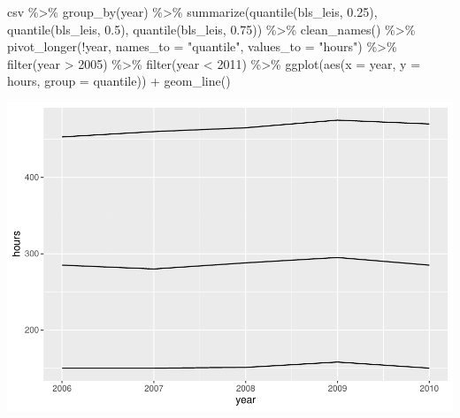 \documentclass[
]{article}
\newenvironment{Shaded}{\begin{snugshade}}{\end{snugshade}}
\newcommand{\AttributeTok}[1]{\textcolor[rgb]{0.77,0.63,0.00}{#1}}
\newcommand{\DecValTok}[1]{\textcolor[rgb]{0.00,0.00,0.81}{#1}}
\newcommand{\FloatTok}[1]{\textcolor[rgb]{0.00,0.00,0.81}{#1}}
\newcommand{\FunctionTok}[1]{\textcolor[rgb]{0.00,0.00,0.00}{#1}}
\newcommand{\NormalTok}[1]{#1}
\newcommand{\SpecialCharTok}[1]{\textcolor[rgb]{0.00,0.00,0.00}{#1}}
\newcommand{\StringTok}[1]{\textcolor[rgb]{0.31,0.60,0.02}{#1}}
\begin{document}
\begin{Shaded}
\begin{Highlighting}[]
\NormalTok{csv }\SpecialCharTok{\%\textgreater{}\%}
  \FunctionTok{group\_by}\NormalTok{(year) }\SpecialCharTok{\%\textgreater{}\%}
  \FunctionTok{summarize}\NormalTok{(}\FunctionTok{quantile}\NormalTok{(bls\_leis, }\FloatTok{0.25}\NormalTok{), }\FunctionTok{quantile}\NormalTok{(bls\_leis, }\FloatTok{0.5}\NormalTok{), }\FunctionTok{quantile}\NormalTok{(bls\_leis, }\FloatTok{0.75}\NormalTok{)) }\SpecialCharTok{\%\textgreater{}\%}
  \FunctionTok{clean\_names}\NormalTok{() }\SpecialCharTok{\%\textgreater{}\%}
  \FunctionTok{pivot\_longer}\NormalTok{(}\SpecialCharTok{!}\NormalTok{year, }\AttributeTok{names\_to =} \StringTok{"quantile"}\NormalTok{, }\AttributeTok{values\_to =} \StringTok{"hours"}\NormalTok{) }\SpecialCharTok{\%\textgreater{}\%}
  \FunctionTok{filter}\NormalTok{(year }\SpecialCharTok{\textgreater{}} \DecValTok{2005}\NormalTok{) }\SpecialCharTok{\%\textgreater{}\%}
  \FunctionTok{filter}\NormalTok{(year }\SpecialCharTok{\textless{}} \DecValTok{2011}\NormalTok{) }\SpecialCharTok{\%\textgreater{}\%}
  \FunctionTok{ggplot}\NormalTok{(}\FunctionTok{aes}\NormalTok{(}\AttributeTok{x =}\NormalTok{ year, }\AttributeTok{y =}\NormalTok{ hours, }\AttributeTok{group =}\NormalTok{ quantile)) }\SpecialCharTok{+}
  \FunctionTok{geom\_line}\NormalTok{()}
\end{Highlighting}
\end{Shaded}

\includegraphics{Paper2_files/figure-latex/graphs-10.pdf}
\end{document}
